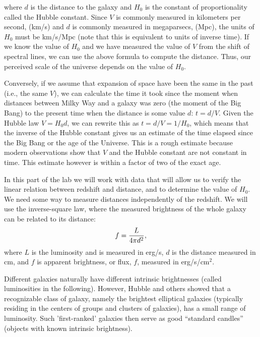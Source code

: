 \documentclass[12pt]{article}
\begin{document}
where $d$ is the distance to the galaxy and $H_0$ is the constant of
proportionality called the Hubble constant. Since $V$ is commonly measured in
kilometers per second, (km/s) and $d$ is commonly measured in megaparsecs,
(Mpc), the units of $H_0$ must be km/s/Mpc (note that this is equivalent to
units of inverse time). If we know the value of $H_0$ and we have measured the
value of $V$ from the shift of spectral lines, we can use the above formula to
compute the distance. Thus, our perceived scale of the universe depends on the
value of $H_0$. 

Conversely, if we assume that expansion of space have been the same in the past (i.e., the same $V$), 
we can calculate the time it took since the moment when distances between Milky Way
and a galaxy was zero (the moment of the Big Bang) to the present time when the distance is some value $d$: 
$t=d/V$. Given the Hubble law $V=H_0d$, we can rewrite this as $t=d/V=1/H_0$, 
which means that the inverse of the Hubble constant gives us an estimate of the time
elapsed since the Big Bang or the age of the Universe. This is a rough estimate
because modern observations show that $V$ and the Hubble constant are not constant
in time. This estimate however is within a factor of two of the exact age. 

In this part of the lab we will work with data that will allow us to verify the
linear relation between redshift and distance, and to determine the value of
$H_0$. We need some way to measure distances independently of the redshift. We
will use the inverse-square law, where the measured brightness of the whole galaxy
can be related to its distance:
\begin{equation}
f = {L\over 4\pi d^2},
\label{eq:flux}
\end{equation}
where $L$ is the luminosity and is measured in erg/s, $d$ is
the distance measured in cm, and $f$ is apparent brightness,
or flux, $f$, measured in erg/s/cm$^2$.

Different galaxies naturally have different
intrinsic brightnesses (called luminosities in the following). However, Hubble
and others showed that a recognizable class of galaxy, namely the brightest
elliptical galaxies (typically residing in the centers of groups and 
clusters of galaxies), has a small range of luminosity. Such
'first-ranked' galaxies then serve as good ``standard candles'' (objects
with known intrinsic brightness). 
\end{document}
